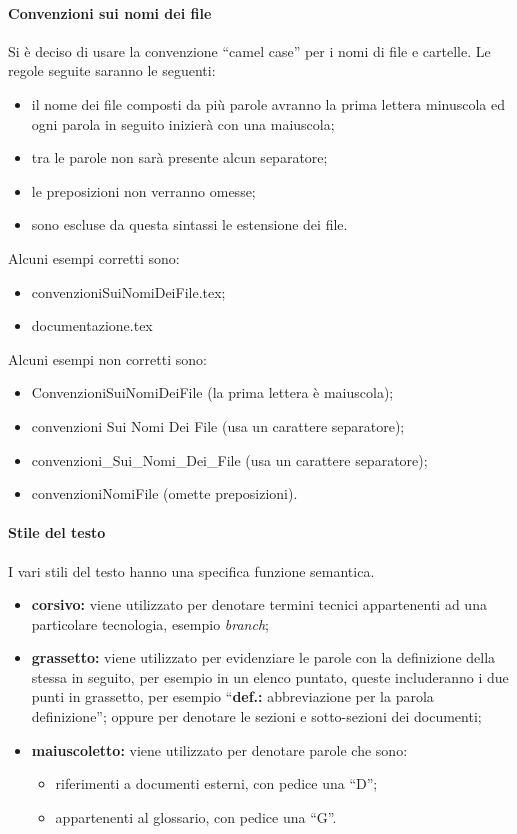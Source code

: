 			\paragraph{Convenzioni sui nomi dei file}
				Si è deciso di usare la convenzione ``camel case'' per i nomi di file e cartelle. Le regole seguite saranno le seguenti:
				\begin{itemize}
					\item il nome dei file composti da più parole avranno la prima lettera minuscola ed ogni parola in seguito inizierà con una maiuscola;
					\item tra le parole non sarà presente alcun separatore;
					\item le preposizioni non verranno omesse;
					\item sono escluse da questa sintassi le estensione dei file.
				\end{itemize}
				Alcuni esempi corretti sono:
				\begin{itemize}
					\item convenzioniSuiNomiDeiFile.tex;
					\item documentazione.tex
				\end{itemize}
				Alcuni esempi non corretti sono:
				\begin{itemize}
					\item ConvenzioniSuiNomiDeiFile (la prima lettera è maiuscola);
					\item convenzioni Sui Nomi Dei File (usa un carattere separatore);
					\item convenzioni\_Sui\_Nomi\_Dei\_File (usa un carattere separatore);
					\item convenzioniNomiFile (omette preposizioni).
				\end{itemize}
			\paragraph{Stile del testo}
				I vari stili del testo hanno una specifica funzione semantica.
				\begin{itemize}
					\item \textbf{corsivo:} viene utilizzato per denotare termini tecnici appartenenti ad una particolare tecnologia, esempio \textit{branch};
					\item \textbf{grassetto:} viene utilizzato per evidenziare le parole con la definizione della stessa in seguito, per esempio in un elenco puntato, queste includeranno i due punti in grassetto, per esempio ``\textbf{def.:} abbreviazione per la parola definizione''; oppure per denotare le sezioni e sotto-sezioni dei documenti;
					\item \textbf{maiuscoletto:} viene utilizzato per denotare parole che sono:
						\begin{itemize}
							\item riferimenti a documenti esterni, con pedice una ``D'';
							\item appartenenti al glossario, con pedice una ``G''.
						\end{itemize}
				\end{itemize}
